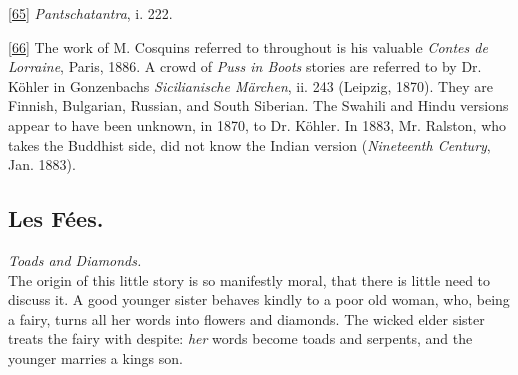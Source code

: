 \documentclass[14pt,a4paper]{memoir}
\begin{document}
\protect\hypertarget{4533318093929944247_33931-h-1.htm.xhtmlux5cux23Footnote_65}{}{}\protect\hyperlink{4533318093929944247_33931-h-0.htm.xhtmlux5cux23FNanchor_65}{{{[}65{]}}}
\emph{Pantschatantra}, i. 222.

\protect\hypertarget{4533318093929944247_33931-h-1.htm.xhtmlux5cux23Footnote_66}{}{}\protect\hyperlink{4533318093929944247_33931-h-1.htm.xhtmlux5cux23FNanchor_66}{{{[}66{]}}}
The work of M. Cosquin\textquotesingle s referred to throughout is his
valuable \emph{Contes de Lorraine}, Paris, 1886. A crowd of \emph{Puss
in Boots} stories are referred to by Dr. Köhler in
Gonzenbach\textquotesingle s \emph{Sicilianische Märchen}, ii. 243
(Leipzig, 1870). They are Finnish, Bulgarian, Russian, and South
Siberian. The Swahili and Hindu versions appear to have been unknown, in
1870, to Dr. Köhler. In 1883, Mr. Ralston, who takes the Buddhist side,
did not know the Indian version (\emph{Nineteenth Century}, Jan. 1883).

\subsection{Les Fées.}

\emph{Toads and Diamonds.} \\

The origin of this little story is so manifestly moral, that there is
little need to discuss it. A good younger sister behaves kindly to a
poor old woman, who, being a fairy, turns all her words into flowers and
diamonds. The wicked elder sister treats the fairy with despite:
\emph{her} words become toads and serpents, and the younger marries a
king\textquotesingle s son.
\end{document}
